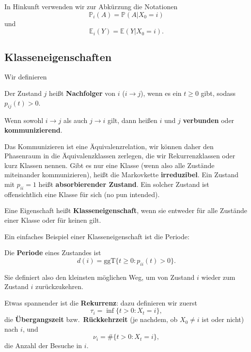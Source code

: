 In Hinkunft verwenden wir zur Abkürzung die Notationen
\[\mathbb P_i(A)=\mathbb P(A|X_0=i)\]
und
\[\mathbb E_i(Y)=\mathbb E(Y|X_0=i).\]
\subsection{Klasseneigenschaften}
\label{sec:klasseneigenschaften}
Wir definieren
\begin{definition}
    \label{def:nachfolger}\label{def:verbunden}\label{def:kommunizierend}
Der Zustand $j$ heißt \textbf{Nachfolger} von $i$ ($i\rightarrow j$), wenn es ein
$t\ge 0$ gibt, sodass $p_{ij}(t)>0$.

Wenn sowohl $i\rightarrow j$ als auch $j\rightarrow i$ gilt, dann heißen
$i$ und $j$ \textbf{verbunden} oder \textbf{kommunizierend}.
\end{definition}

Das Kommunizieren ist eine Äquivalenzrelation, wir können daher 
den Phasenraum in die Äquivalenzklassen zerlegen, die wir Rekurrenzklassen
oder kurz Klassen nennen. Gibt es nur eine Klasse (wenn also alle
Zustände miteinander kommunizieren), heißt die Markovkette \textbf{irreduzibel}.
Ein Zustand mit $p_{ii}=1$ heißt \textbf{absorbierender Zustand}. Ein solcher Zustand
ist offensichtlich eine Klasse für sich (no pun intended).
\begin{definition}
    \label{def:klasseneigenschaft}
Eine Eigenschaft heißt \textbf{Klasseneigenschaft}, wenn sie entweder für alle
Zustände einer Klasse oder für  keinen gilt.
\end{definition}

Ein einfaches Beispiel einer Klasseneigenschaft ist die Periode:
\begin{definition}
    \label{def:periode}
Die \textbf{Periode} eines Zustandes ist
\[d(i)=\mathrm{ggT}\{t\ge 0:p_{ii}(t)>0\}.\]

Sie definiert also den kleinsten möglichen Weg, um von Zustand $i$ wieder zum Zustand $i$ zurückzukehren.
\end{definition}
Etwas spannender ist die \textbf{Rekurrenz}: dazu definieren wir zuerst
\[\tau_i=\inf\{t>0:X_t=i\},\]
die \textbf{Übergangszeit} bzw.\ \textbf{Rückkehrzeit} (je nachdem, ob $X_0\neq i$ ist
oder nicht) nach $i$,
und
\[\nu_i=\#\{t>0:X_t=i\},\]
die Anzahl der Besuche in $i$.

